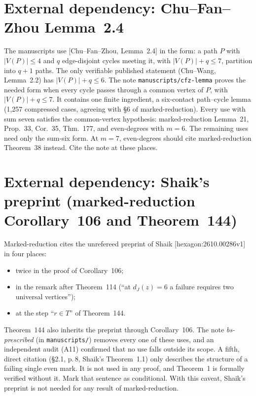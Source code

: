 \documentclass[11pt]{amsart}
\begin{document}
\section{External dependency: Chu--Fan--Zhou Lemma~2.4}
The manuscripts use [Chu--Fan--Zhou, Lemma~2.4] in the form: a path $P$ with $|V(P)|\le4$ and $q$
edge-disjoint cycles meeting it, with $|V(P)|+q\le7$, partition into $q+1$ paths. The only verifiable
published statement (Chu--Wang, Lemma~2.2) has $|V(P)|+q\le6$. The note \texttt{manuscripts/cfz-lemma} proves
the needed form when every cycle passes through a common vertex of $P$, with $|V(P)|+q\le7$. It
contains one finite ingredient, a six-contact path--cycle lemma (1{,}257 compressed cases, agreeing with
\S6 of marked-reduction). Every use with sum seven satisfies the common-vertex hypothesis:
marked-reduction Lemma~21, Prop.~33, Cor.~35, Thm.~177, and even-degrees with $m=6$. The remaining uses need only
the sum-six form. At $m=7$, even-degrees should cite marked-reduction Theorem~38 instead. Cite the note at
these places.

\section{External dependency: Shaik's preprint (marked-reduction Corollary~106 and Theorem~144)}\label{sec:shaik}

Marked-reduction cites the unrefereed preprint of Shaik [hexagon:2610.00286v1] in four places:
\begin{itemize}
\item twice in the proof of Corollary~106;
\item in the remark after Theorem~114 (``at $d_J(z)=6$ a failure requires two universal vertices'');
\item at the step ``$r\in T$'' of Theorem~144.
\end{itemize}
Theorem~144 also inherits the preprint through Corollary~106. The note \emph{bs-prescribed}
(in \texttt{manuscripts/}) removes every one of these uses, and an independent audit (A11) confirmed
that no use falls outside its scope. A fifth, direct citation (\S2.1, p.\,8, Shaik's Theorem~1.1) only
describes the structure of a failing single even mark. It is not used in any proof, and Theorem~1 is
formally verified without it. Mark that sentence as conditional. With this caveat, Shaik's preprint is
not needed for any result of marked-reduction.
\end{document}
